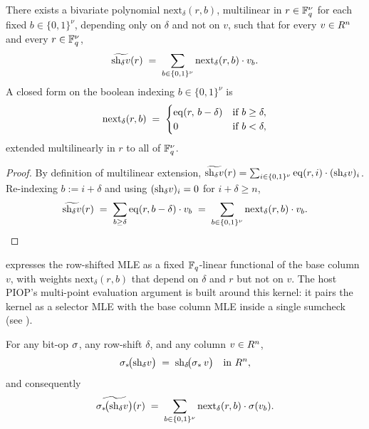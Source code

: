 \begin{lemma}
\label{lem:row-shift-kernel}
There exists a bivariate polynomial
$\mathrm{next}_\delta(r, b)$, multilinear in $r \in \mathbb{F}_q^{\nu}$ for
each fixed $b \in \{0,1\}^{\nu}$, depending only on $\delta$ and not on
$v$, such that for every $v \in R^n$ and every
$r \in \mathbb{F}_q^{\nu}$,
\begin{equation}
\label{eq:row-shift-mle}
  \widetilde{\mathrm{sh}_{\delta} v}(r) \;=\; \sum_{b \in \{0,1\}^{\nu}} \mathrm{next}_\delta(r, b) \cdot v_b.
\end{equation}
A closed form on the boolean indexing $b \in \{0,1\}^{\nu}$ is
\[
  \mathrm{next}_\delta(r, b) \;=\;
  \begin{cases}
    \operatorname{eq}(r,\, b - \delta) & \text{if } b \ge \delta, \\
    0 & \text{if } b < \delta,
  \end{cases}
\]
extended multilinearly in $r$ to all of $\mathbb{F}_q^{\nu}$.
\end{lemma}

\begin{proof}
By definition of multilinear extension,
$\widetilde{\mathrm{sh}_{\delta} v}(r) = \sum_{i \in \{0,1\}^{\nu}} \operatorname{eq}(r, i) \cdot (\mathrm{sh}_{\delta} v)_i$.
Re-indexing $b := i + \delta$ and using
$(\mathrm{sh}_{\delta} v)_i = 0$ for $i + \delta \ge n$,
\[
  \widetilde{\mathrm{sh}_{\delta} v}(r) \;=\; \sum_{b \ge \delta} \operatorname{eq}(r, b - \delta) \cdot v_b
  \;=\; \sum_{b \in \{0,1\}^{\nu}} \mathrm{next}_\delta(r, b) \cdot v_b. \qedhere
\]
\end{proof}

 expresses the row-shifted MLE as a fixed
$\mathbb{F}_q$-linear functional of the base column $v$, with weights
$\mathrm{next}_\delta(r, b)$ that depend on $\delta$ and $r$ but not on
$v$. The host PIOP's multi-point evaluation argument is built around
this kernel: it pairs the kernel as a selector MLE with the base
column MLE inside a single sumcheck (see ).

\begin{corollary}
\label{cor:bitop-shift-commute}
For any bit-op $\sigma$, any row-shift $\delta$, and any column
$v \in R^n$,
\begin{equation}
\label{eq:bitop-shift-commute}
  \sigma_*\!\big(\mathrm{sh}_{\delta} v\big) \;=\; \mathrm{sh}_{\delta}\!\big(\sigma_*\, v\big) \quad\text{in } R^n,
\end{equation}
and consequently
\begin{equation}
\label{eq:bitop-shift-mle}
  \widetilde{\sigma_*\!\big(\mathrm{sh}_{\delta} v\big)}(r)
  \;=\;
  \sum_{b \in \{0,1\}^{\nu}} \mathrm{next}_\delta(r, b)\cdot \sigma(v_b).
\end{equation}
\end{corollary}

